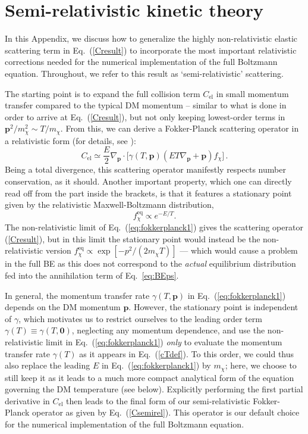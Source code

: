 \documentclass[twocolumn,showpacs,amsmath,amssymb,superscriptaddress,nofootinbib]{revtex4-1}
\newcommand{\be}{\begin{equation}}
\newcommand{\ee}{\end{equation}}
\begin{document}
\section{Semi-relativistic kinetic theory}
\label{app:semirel}

In this Appendix, we discuss how to generalize the highly non-relativistic elastic scattering term in Eq.~(\ref{Cresult})
to incorporate the most important relativistic corrections needed for the numerical implementation of 
the full Boltzmann equation. 
Throughout, we refer to this result as `semi-relativistic' scattering.

The starting point is to expand the full collision term $C_{\text{el}}$ in small momentum 
transfer compared to the typical DM momentum -- similar to what is done in order to arrive
at Eq.~(\ref{Cresult}), but not only keeping lowest-order terms in $\mathbf{p}^2/m_\chi^2\sim T/m_\chi$. 
From this, we can derive
a Fokker-Planck scattering operator in a relativistic form (for details, see \cite{Binder:2016pnr}):
\be
C_\mathrm{el}\simeq
\frac{E}{2} \nabla_{\mathbf{p}} \cdot
{\Bigg [}
\gamma(T,\mathbf{p})
\left (
E T  \nabla_{\mathbf{p}}  + \mathbf{p}
\right ) f_{\chi}
{\Bigg ]}
\,.
\label{eq:fokkerplanck1}
\ee
Being a total divergence, this scattering operator manifestly respects number conservation, as it should.
Another important property, which one can directly read off from the part inside the brackets, is that it
features a stationary point given by the relativistic Maxwell-Boltzmann distribution,
\be
\label{expET}
f_{\chi}^{\text{eq}} \propto e^{- E/T}.
\ee
The non-relativistic limit of Eq.~(\ref{eq:fokkerplanck1}) gives the scattering operator (\ref{Cresult}), but in this limit the 
stationary point would instead be the non-relativistic version 
 $f_{\chi}^{\text{eq}} \propto \exp[-p^2/(2m_\chi T)]$  --- 
which would cause a problem in the full BE as this does not correspond to the {\it actual} equilibrium distribution fed 
into the annihilation term of  Eq.~\eqref{eq:BEps}.


In general,  the momentum transfer rate $\gamma(T,\mathbf{p})$ in Eq.~(\ref{eq:fokkerplanck1}) 
depends on the DM momentum $\mathbf{p}$. However, the stationary point is independent of 
$\gamma$, which motivates us to restrict ourselves to the leading order term 
$\gamma(T) \equiv \gamma(T,\mathbf{0})$, neglecting any momentum dependence, and 
use the non-relativistic limit in Eq.~(\ref{eq:fokkerplanck1}) \emph{only} to evaluate the momentum transfer rate 
$\gamma(T)$ as it appears in Eq.~(\ref{cTdef}). To this order, we could thus also replace the leading $E$ in 
Eq.~(\ref{eq:fokkerplanck1}) by $m_\chi$; here, we choose to still keep it as it leads to a much more compact 
analytical form of the equation governing the DM temperature (see below). 
Explicitly performing the first partial derivative in $C_{\text{el}}$ then leads to the final form of our 
semi-relativistic Fokker-Planck operator as given by Eq.~(\ref{Csemirel}). 
This operator is our default choice for the numerical implementation of the full Boltzmann equation.
\end{document}
